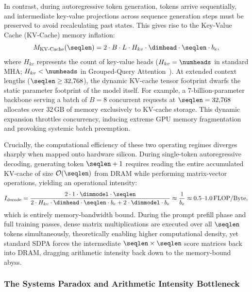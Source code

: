 In contrast, during autoregressive token generation, tokens arrive sequentially, and intermediate key-value projections across sequence generation steps must be preserved to avoid recalculating past states.
This gives rise to the Key-Value Cache (KV-Cache) memory inflation:
\begin{equation}
\label{eq:kv_cache_scaling}
M_{\text{KV-Cache}}(\seqlen) = 2 \cdot B \cdot L \cdot H_{kv} \cdot \dimhead \cdot \seqlen \cdot b_e,
\end{equation}
where $H_{kv}$ represents the count of key-value heads ($H_{kv} = \numheads$ in standard MHA; $H_{kv} < \numheads$ in Grouped-Query Attention~\cite{ainslie2023gqa}).
At extended context lengths ($\seqlen \ge 32{,}768$), the dynamic KV-cache tensor footprint dwarfs the static parameter footprint of the model itself.
For example, a 7-billion-parameter backbone serving a batch of $B = 8$ concurrent requests at $\seqlen = 32{,}768$ allocates over $32\,\text{GB}$ of memory exclusively to KV-cache storage.
This dynamic expansion throttles concurrency, inducing extreme GPU memory fragmentation and provoking systemic batch preemption.

Crucially, the computational efficiency of these two operating regimes diverges sharply when mapped onto hardware silicon.
During single-token autoregressive decoding, generating token $\seqlen+1$ requires reading the entire accumulated KV-cache of size $\mathcal{O}(\seqlen)$ from DRAM while performing matrix-vector operations, yielding an operational intensity:
\begin{equation}
\label{eq:decode_arithmetic_intensity}
I_{\text{decode}} = \frac{2 \cdot 1 \cdot \dimmodel \cdot \seqlen}{2 \cdot H_{kv} \cdot \dimhead \cdot \seqlen \cdot b_e + 2 \cdot \dimmodel \cdot b_e} \approx \frac{1}{b_e} \approx 0.5\text{--}1.0\,\text{FLOP/Byte},
\end{equation}
which is entirely memory-bandwidth bound.
During the prompt prefill phase and full training passes, dense matrix multiplications are executed over all $\seqlen$ tokens simultaneously, theoretically enabling higher computational density, yet standard SDPA forces the intermediate $\seqlen \times \seqlen$ score matrices back into DRAM, dragging arithmetic intensity back down to the memory-bound abyss.

\subsubsection{The Systems Paradox and Arithmetic Intensity Bottleneck}
\label{subsubsec:systems_paradox}

